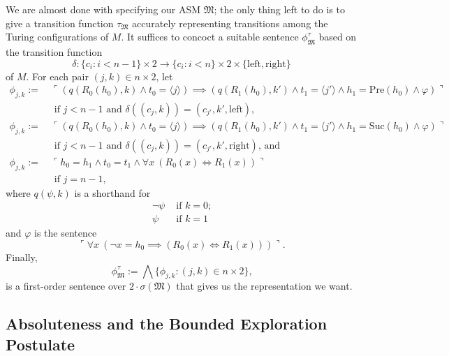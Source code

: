 \documentclass[12pt]{article}
\numberwithin{equation}{section}
\begin{document}
\begin{ex}
We are almost done with specifying our ASM $\mathfrak{M}$; the only thing left to do is to give a transition function $\tau_{\mathfrak{M}}$ accurately representing transitions among the Turing configurations of $M$. It suffices to concoct a suitable sentence $\phi^{\tau}_{\mathfrak{M}}$ based on the transition function $$\delta : \{c_i : i < n-1\} \times 2 \longrightarrow \{c_i : i < n\} \times 2 \times \{\mathrm{left}, \mathrm{right}\}$$ of $M$. For each pair $(j, k) \in n \times 2$, let
\begin{align*}
    \phi_{j,k} := \ & \ulcorner (q(R_0(h_0), k) \wedge t_0 \! = \! \langle j \rangle) \!\! \implies \!\! (q(R_1(h_0), k') \wedge t_1 \! = \! \langle j' \rangle \wedge h_1 \! = \mathrm{Pre}(h_0) \wedge \varphi) \urcorner \\ 
    & \text{ if } j < n-1 \text{ and } \delta((c_j, k)) = (c_{j'}, k', \mathrm{left}) \text{,} \\
    \phi_{j,k} := \ & \ulcorner (q(R_0(h_0), k) \wedge t_0 \! = \! \langle j \rangle) \!\! \implies \!\! (q(R_1(h_0), k') \wedge t_1 \! = \! \langle j' \rangle \wedge h_1 \! = \mathrm{Suc}(h_0) \wedge \varphi) \urcorner \\ 
    & \text{ if } j < n-1 \text{ and } \delta((c_j, k)) = (c_{j'}, k', \mathrm{right}) \text{, and} \\
    \phi_{j,k} := \ & \ulcorner h_0 = h_1 \wedge t_0 = t_1 \wedge \forall x \ (R_0(x) \iff R_1(x)) \urcorner \\ 
    & \text{ if } j = n-1 \text{,}
\end{align*}
where $q(\psi, k)$ is a shorthand for 
\begin{align*}
    \neg \psi & \text{ if } k = 0 \text{;} \\
    \psi & \text{ if } k = 1
\end{align*}
and $\varphi$ is the sentence
\begin{equation*}
    \ulcorner \forall x \ (\neg x = h_0 \implies (R_0(x) \iff R_1(x))) \urcorner \text{.}
\end{equation*}
Finally, 
\begin{equation*}
    \phi^{\tau}_{\mathfrak{M}} := \bigwedge \{\phi_{j,k} : (j, k) \in n \times 2\} \text{,}
\end{equation*}
is a first-order sentence over $2 \cdot \sigma(\mathfrak{M})$ that gives us the representation we want.
\end{ex}

\subsection{Absoluteness and the Bounded Exploration Postulate}
\end{document}

